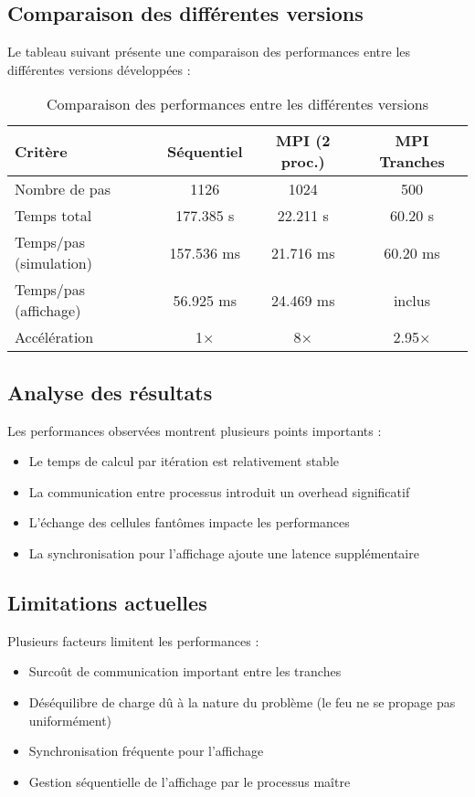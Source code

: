 \documentclass[11pt]{article}
\begin{document}
\subsection{Comparaison des différentes versions}
Le tableau suivant présente une comparaison des performances entre les différentes versions développées :

\begin{table}[H]
    \centering
    \begin{tabular}{|l|c|c|c|}
        \hline
        \textbf{Critère} & \textbf{Séquentiel} & \textbf{MPI (2 proc.)} & \textbf{MPI Tranches} \\
        \hline
        Nombre de pas & 1126 & 1024 & 500 \\
        \hline
        Temps total & 177.385 s & 22.211 s & 60.20 s \\
        \hline
        Temps/pas (simulation) & 157.536 ms & 21.716 ms & 60.20 ms \\
        \hline
        Temps/pas (affichage) & 56.925 ms & 24.469 ms & inclus \\
        \hline
        Accélération & 1× & 8× & 2.95× \\
        \hline
    \end{tabular}
    \caption{Comparaison des performances entre les différentes versions}
    \label{tab:comparaison_performances}
\end{table}

\subsection{Analyse des résultats}
Les performances observées montrent plusieurs points importants :
\begin{itemize}
    \item Le temps de calcul par itération est relativement stable
    \item La communication entre processus introduit un overhead significatif
    \item L'échange des cellules fantômes impacte les performances
    \item La synchronisation pour l'affichage ajoute une latence supplémentaire
\end{itemize}

\subsection{Limitations actuelles}
Plusieurs facteurs limitent les performances :
\begin{itemize}
    \item Surcoût de communication important entre les tranches
    \item Déséquilibre de charge dû à la nature du problème (le feu ne se propage pas uniformément)
    \item Synchronisation fréquente pour l'affichage
    \item Gestion séquentielle de l'affichage par le processus maître
\end{itemize}
\end{document}

